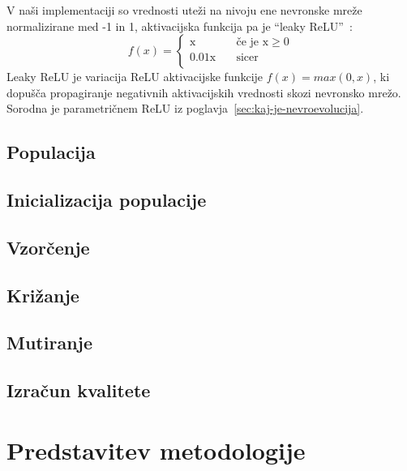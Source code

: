 \documentclass[a4paper,12pt,openright]{book}
\begin{document}
    V naši implementaciji so vrednosti uteži na nivoju ene nevronske mreže normalizirane med -1 in 1, aktivacijska
    funkcija pa je ``leaky ReLU''~\cite{maas2013rectifier}:
    \begin{equation}
        f(x)=
        \begin{cases}
            \text{x} & \quad\text{če je x}\ge0\\
            \text{0.01x} & \quad\text{sicer}\\
        \end{cases}
        \label{eq:leaky_relu}
    \end{equation}
    Leaky ReLU je variacija ReLU aktivacijske funkcije $f(x)=max(0,x)$, ki dopušča propagiranje negativnih aktivacijskih
    vrednosti skozi nevronsko mrežo.
    Sorodna je parametričnem ReLU iz poglavja~\ref{sec:kaj-je-nevroevolucija}.


    \section{Populacija}

    \section{Inicializacija populacije}

    \section{Vzorčenje}\label{sec:vzorcenje}


    \section{Križanje}\label{sec:krizanje}


    \section{Mutiranje}\label{sec:mutiranje}


    \section{Izračun kvalitete}


    \chapter{Predstavitev metodologije}
\end{document}
